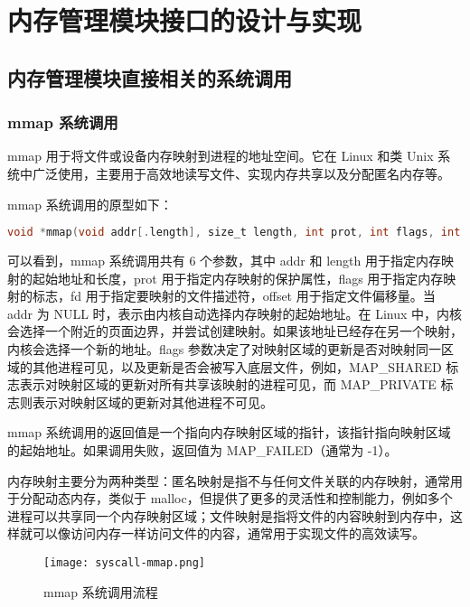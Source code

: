 

\chapter{内存管理模块接口的设计与实现}

\section{内存管理模块直接相关的系统调用}

\subsection{mmap 系统调用}
mmap 用于将文件或设备内存映射到进程的地址空间。它在 Linux 和类 Unix 系统中广泛使用，主要用于高效地读写文件、实现内存共享以及分配匿名内存等。

mmap 系统调用的原型如下：


\begin{lstlisting}[language=C, caption=mmap]
    void *mmap(void addr[.length], size_t length, int prot, int flags, int fd, off_t offset);
\end{lstlisting}



可以看到，mmap 系统调用共有 6 个参数，其中 addr 和 length 用于指定内存映射的起始地址和长度，prot 用于指定内存映射的保护属性，flags 用于指定内存映射的标志，fd 用于指定要映射的文件描述符，offset 用于指定文件偏移量。当 addr 为 NULL 时，表示由内核自动选择内存映射的起始地址。在 Linux 中，内核会选择一个附近的页面边界，并尝试创建映射。如果该地址已经存在另一个映射，内核会选择一个新的地址。flags 参数决定了对映射区域的更新是否对映射同一区域的其他进程可见，以及更新是否会被写入底层文件，例如，MAP\_SHARED 标志表示对映射区域的更新对所有共享该映射的进程可见，而 MAP\_PRIVATE 标志则表示对映射区域的更新对其他进程不可见。

mmap 系统调用的返回值是一个指向内存映射区域的指针，该指针指向映射区域的起始地址。如果调用失败，返回值为 MAP\_FAILED（通常为 -1）。

内存映射主要分为两种类型：匿名映射是指不与任何文件关联的内存映射，通常用于分配动态内存，类似于 malloc，但提供了更多的灵活性和控制能力，例如多个进程可以共享同一个内存映射区域；文件映射是指将文件的内容映射到内存中，这样就可以像访问内存一样访问文件的内容，通常用于实现文件的高效读写。

\begin{figure}[H]
    \centering
    \texttt{[image: syscall-mmap.png]}
    \caption{mmap 系统调用流程}
    \label{fig:mmap}
\end{figure}

